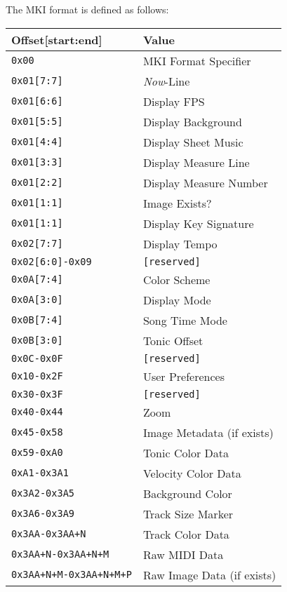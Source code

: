 \documentclass[english]{article}
\makeatletter
\newenvironment{restoretext}%
    {\@parboxrestore%
     \begin{adjustwidth}{}{\leftmargin}%
    }{\end{adjustwidth}
     }
\def\rcbegin{\begin{restoretext}\centering}
\def\rcend{\end{restoretext}}
\providecommand{\mi}[1]{\texttt{#1}}
\makeatother
\begin{document}
The MKI format is defined as follows:

\vspace{1em}

\rcbegin
\begin{tabular}{|l|l|}
  \hline
  \textbf{Offset[start:end]}    & \textbf{Value} \\
  \hline
  \mi{0x00}                       & MKI Format Specifier\\
  \mi{0x01[7:7]}                  & \textit{Now}-Line \\
  \mi{0x01[6:6]}                  & Display FPS \\
  \mi{0x01[5:5]}                  & Display Background \\
  \mi{0x01[4:4]}                  & Display Sheet Music \\
  \mi{0x01[3:3]}                  & Display Measure Line \\
  \mi{0x01[2:2]}                  & Display Measure Number \\
  \mi{0x01[1:1]}                  & Image Exists? \\
  \mi{0x01[1:1]}                  & Display Key Signature \\
  \mi{0x02[7:7]}                  & Display Tempo \\
  \mi{0x02[6:0]-0x09}             & \mi{[reserved]} \\
  \mi{0x0A[7:4]}                  & Color Scheme \\
  \mi{0x0A[3:0]}                  & Display Mode \\
  \mi{0x0B[7:4]}                  & Song Time Mode \\
  \mi{0x0B[3:0]}                  & Tonic Offset \\
  \mi{0x0C-0x0F}			            & \mi{[reserved]} \\
  \mi{0x10-0x2F}			            & User Preferences \\
  \mi{0x30-0x3F}			            & \mi{[reserved]} \\
  \mi{0x40-0x44}                  & Zoom \\
  \mi{0x45-0x58}                  & Image Metadata (if exists) \\
  \mi{0x59-0xA0}                  & Tonic Color Data \\
  \mi{0xA1-0x3A1}                 & Velocity Color Data \\
  \mi{0x3A2-0x3A5}                & Background Color \\
  \mi{0x3A6-0x3A9}                & Track Size Marker \\
  \mi{0x3AA-0x3AA+N}              & Track Color Data \\
  \mi{0x3AA+N-0x3AA+N+M}          & Raw MIDI Data \\
  \mi{0x3AA+N+M-0x3AA+N+M+P}      & Raw Image Data (if exists) \\

  \hline
\end{tabular}
\rcend
\end{document}
